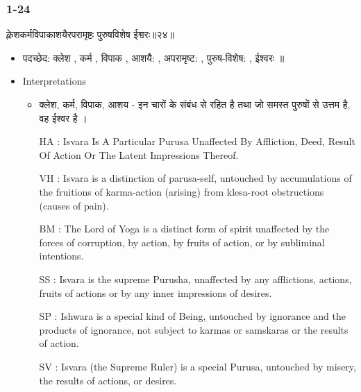 \begin{frame}[fragile]\frametitle{1-24}
\begin{sanskrit}
क्लेशकर्मविपाकाशयैरपरामृष्टः पुरुषविशेष ईश्वरः॥२४॥
\end{sanskrit}

	\begin{itemize}
	\item पदच्छेद: क्लेश , कर्म , विपाक , आशयै: , अपरामृष्ट: , पुरुष-विशेष: , ईश्वरः ॥
	\item Interpretations
		\begin{itemize}		
		\item क्लेश, कर्म, विपाक, आशय - इन चारों के संबंध से रहित है तथा जो समस्त पुरुषों से उत्तम है, वह ईश्वर है ।
		\item [HA]: Isvara Is A Particular Purusa Unaffected By Affliction, Deed, Result Of Action Or The Latent Impressions Thereof.
		\item [VH]: Isvara is a distinction of parusa-self, untouched by accumulations of the fruitions of karma-action (arising) from klesa-root obstructions (causes of pain).
		\item [BM]: The Lord of Yoga is a distinct form of spirit unaffected by the forces of corruption, by action, by fruits of action, or by subliminal intentions.
		\item [SS]: Isvara is the supreme Purusha, unaffected by any afflictions, actions, fruits of actions or by any inner impressions of desires.
		\item [SP]: Ishwara is a special kind of Being, untouched by ignorance and the products of ignorance, not subject to karmas or samskaras or the results of action.
		\item [SV]: Isvara (the Supreme Ruler) is a special Purusa, untouched by misery, the results of actions, or desires. 
		\end{itemize}
	\end{itemize}
	
\end{frame}

